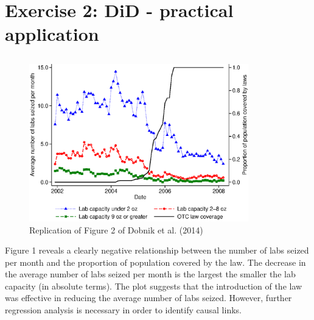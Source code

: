 \documentclass[%
  fontsize=11pt, %
  version=last,%
  headsepline,
  titlepage = false,
  DIV = 11, %
  abstract = false
]{scrartcl}
\begin{document}
\section*{Exercise 2: DiD - practical application}



\subsection{} %
	\begin{figure}[H]
		\centering
		\caption{Replication of Figure 2 of Dobnik et al. (2014)}		\label{fig:Fig2}
		\includegraphics[width=0.85\textwidth]{Figure2_Replication.eps}
	\end{figure}
Figure 1 reveals a clearly negative relationship between the number of labs seized per month and the proportion of population covered by the law. The decrease in the average number of labs seized per month is the largest the smaller the lab capacity (in absolute terms). The plot suggests that the introduction of the law was effective in reducing the average number of labs seized. However, further regression analysis is necessary in order to identify causal links. \\
\newpage
%
\end{document}
